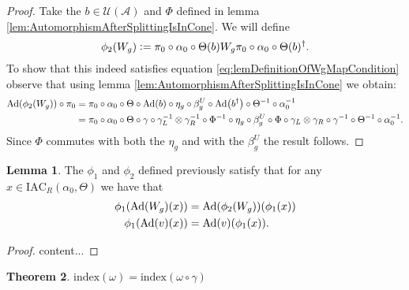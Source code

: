 \documentclass[12pt,a4paper,twoside]{article}
\newcommand{\defeq}{\vcentcolon=}
\let\originalleft\left
\let\originalright\right
\renewcommand{\left}{\mathopen{}\mathclose\bgroup\originalleft}
\renewcommand{\right}{\aftergroup\egroup\originalright}
\newcommand{\UU}{\mathcal U}
\renewcommand{\AA}{\mathcal A}
\newcommand{\Ad}[1]{\textrm{Ad}\left(#1\right)}
\theoremstyle{definition}
\newtheorem{theorem}{Theorem}[section]
\newtheorem{lemma}[theorem]{Lemma}
\numberwithin{equation}{section}
\begin{document}
\begin{proof}
	Take the $b\in\UU(\AA)$ and $\Phi$ defined in lemma \ref{lem:AutomorphismAfterSplittingIsInCone}. We will define
	\begin{equation}
		\phi_2(W_g)\defeq \pi_0\circ\alpha_0\circ\Theta(b)W_g\pi_0\circ\alpha_0\circ\Theta(b)^\dagger.
	\end{equation}
	To show that this indeed satisfies equation \eqref{eq:lemDefinitionOfWgMapCondition} observe that using lemma \ref{lem:AutomorphismAfterSplittingIsInCone} we obtain:
	\begin{align}
		\Ad{\phi_2(W_g)}\circ\pi_0&=\pi_0\circ \alpha_0\circ\Theta\circ\Ad{b}\circ\eta_g\circ\beta_g^U\circ\Ad{b^{\dagger}}\circ\Theta^{-1}\circ\alpha_0^{-1}\\
		&=\pi_0\circ \alpha_0\circ\Theta\circ\gamma\circ\gamma_L^{-1}\otimes\gamma_R^{-1}\circ\Phi^{-1}\circ\eta_g\circ\beta_g^U\circ\Phi\circ\gamma_L\otimes\gamma_R\circ\gamma^{-1}\circ\Theta^{-1}\circ\alpha_0^{-1}.
	\end{align}
	Since $\Phi$ commutes with both the $\eta_g$ and with the $\beta_g^U$ the result follows.
\end{proof}
\begin{lemma}
	The $\phi_1$ and $\phi_2$ defined previously satisfy that for any $x\in\textrm{IAC}_R(\alpha_0,\Theta)$ we have that
		\begin{align}
			\phi_1(\Ad{W_g}(x))&=\Ad{\phi_2(W_g)}(\phi_1(x))\\
			\phi_1(\Ad{v}(x))&=\Ad{v}(\phi_1(x)).
	\end{align}
\end{lemma}
\begin{proof}
	content...
\end{proof}
\begin{theorem}
	$\textrm{index}(\omega)=\textrm{index}(\omega\circ\gamma)$
\end{theorem}
\end{document}
